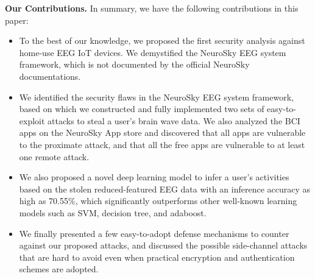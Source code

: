 \indent \textbf{Our Contributions.} In summary, we have the following contributions in this paper:
\begin{itemize}
\item To the best of our knowledge, we proposed the first security analysis against home-use EEG IoT devices. We demystified the NeuroSky EEG system framework, which is not documented by the official NeuroSky documentations.

\item We identified the security flaws in the NeuroSky EEG system framework, based on which we constructed and fully implemented two sets of easy-to-exploit attacks to steal a user's brain wave data. %
We also analyzed the BCI apps on the NeuroSky App store and discovered that all apps are vulnerable to the proximate attack, and that all the free apps are vulnerable to at least one remote attack. %

\item We also proposed a novel deep learning model to infer a user's activities based on the stolen reduced-featured EEG data with an inference accuracy as high as 70.55\%, which significantly outperforms other well-known learning models such as SVM, decision tree, and adaboost.

\item We finally presented a few easy-to-adopt defense mechanisms to counter against our proposed attacks, and discussed the possible side-channel attacks that are hard to avoid even when practical encryption and authentication schemes are adopted.
		
\end{itemize}

